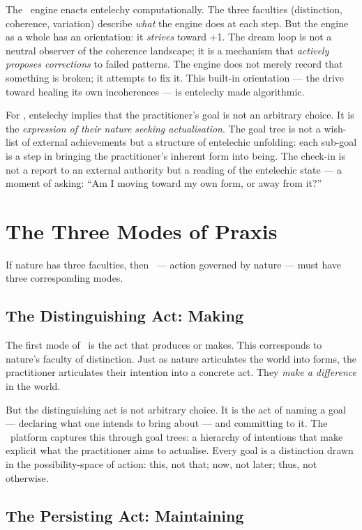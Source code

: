 The \physis\ engine enacts entelechy computationally. The three faculties
(distinction, coherence, variation) describe \emph{what} the engine does at
each step. But the engine as a whole has an orientation: it \emph{strives}
toward +1. The dream loop is not a neutral observer of the coherence landscape;
it is a mechanism that \emph{actively proposes corrections} to failed patterns.
The engine does not merely record that something is broken; it attempts to fix
it. This built-in orientation --- the drive toward healing its own
incoherences --- is entelechy made algorithmic.

For \praxis, entelechy implies that the practitioner's goal is not an arbitrary
choice. It is the \emph{expression of their nature seeking actualisation}. The
goal tree is not a wish-list of external achievements but a structure of
entelechic unfolding: each sub-goal is a step in bringing the practitioner's
inherent form into being. The check-in is not a report to an external authority
but a reading of the entelechic state --- a moment of asking: ``Am I moving
toward my own form, or away from it?''

\section{The Three Modes of Praxis}

If nature has three faculties, then \praxis\ --- action governed by nature ---
must have three corresponding modes.

\subsection{The Distinguishing Act: Making}

The first mode of \praxis\ is the act that produces or makes. This corresponds
to nature's faculty of distinction. Just as nature articulates the world into
forms, the practitioner articulates their intention into a concrete act. They
\emph{make a difference} in the world.

But the distinguishing act is not arbitrary choice. It is the act of naming a
goal --- declaring what one intends to bring about --- and committing to it.
The \praxis\ platform captures this through goal trees: a hierarchy of intentions
that make explicit what the practitioner aims to actualise. Every goal is a
distinction drawn in the possibility-space of action: this, not that; now, not
later; thus, not otherwise.

\subsection{The Persisting Act: Maintaining}

